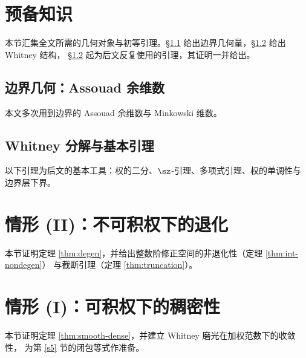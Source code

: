\section{预备知识}\label{s2}

本节汇集全文所需的几何对象与初等引理。\S\ref{ss2.1} 给出边界几何量，\S\ref{ss2.2} 给出 Whitney 结构，
\S\ref{ss2.2} 起为后文反复使用的引理，其证明一并给出。

\subsection{边界几何：Assouad 余维数}\label{ss2.1}

本文多次用到边界的 Assouad 余维数与 Minkowski 维数。



\subsection{Whitney 分解与基本引理}\label{ss2.2}

以下引理为后文的基本工具：权的二分、$\sz$-引理、多项式引理、权的单调性与边界层下界。



\section{情形 (II)：不可积权下的退化}\label{s3}

本节证明定理 \ref{thm:degen}，并给出整数阶修正空间的非退化性（定理 \ref{thm:int-nondegen}）
与截断引理（定理 \ref{thm:truncation}）。



\section{情形 (I)：可积权下的稠密性}\label{s4}

本节证明定理 \ref{thm:smooth-dense}，并建立 Whitney 磨光在加权范数下的收敛性，
为第 \ref{s5} 节的闭包等式作准备。



